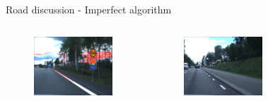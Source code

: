\documentclass[12pt]{beamer}
\begin{document}
\begin{frame}{Road discussion - Imperfect algorithm}
    \begin{columns}
        \begin{figure}
            \includegraphics[width = \textwidth]{resources/png/roadbad1.png}
        \end{figure}
        \vspace{-1.3em}
        \begin{figure}
            \includegraphics[width = \textwidth]{resources/png/roadbad2.png}
        \end{figure}
        \begin{figure}

\end{figure}
\end{columns}
\end{frame}
\end{document}
